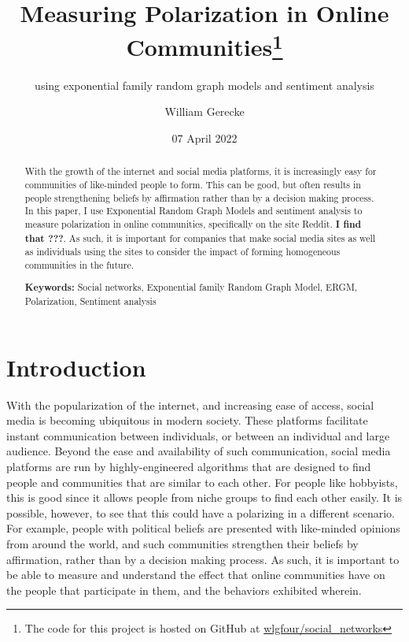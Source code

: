 \documentclass[
]{article}
\title{Measuring Polarization in Online Communities\thanks{The code for this project is hosted on GitHub at \href{https://github.com/wlgfour/social_networks}{wlgfour/social\_networks}}}
\subtitle{using exponential family random graph models and sentiment analysis}
\author{William Gerecke}
\date{07 April 2022}
\begin{document}
\maketitle
\begin{abstract}
With the growth of the internet and social media platforms, it is increasingly easy for communities of like-minded people to form. This can be good, but often results in people strengthening beliefs by affirmation rather than by a decision making process. In this paper, I use Exponential Random Graph Models and sentiment analysis to measure polarization in online communities, specifically on the site Reddit. \textbf{I find that ???}. As such, it is important for companies that make social media sites as well as individuals using the sites to consider the impact of forming homogeneous communities in the future.

\par

\textbf {Keywords:} Social networks, Exponential family Random Graph Model, ERGM, Polarization, Sentiment analysis
\end{abstract}

\newpage
\tableofcontents

\newpage

\hypertarget{introduction}{%
\section{Introduction}\label{introduction}}

With the popularization of the internet, and increasing ease of access, social media is becoming ubiquitous in modern society. These platforms facilitate instant communication between individuals, or between an individual and large audience. Beyond the ease and availability of such communication, social media platforms are run by highly-engineered algorithms that are designed to find people and communities that are similar to each other. For people like hobbyists, this is good since it allows people from niche groups to find each other easily. It is possible, however, to see that this could have a polarizing in a different scenario. For example, people with political beliefs are presented with like-minded opinions from around the world, and such communities strengthen their beliefs by affirmation, rather than by a decision making process. As such, it is important to be able to measure and understand the effect that online communities have on the people that participate in them, and the behaviors exhibited wherein.
\end{document}
